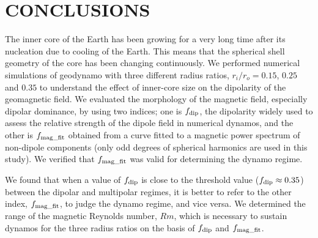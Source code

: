 \section{CONCLUSIONS}

{\color{red}
The inner core of the Earth has been growing for a very long time after its nucleation due to cooling of the Earth.
This means that the spherical shell geometry of the core has been changing continuously.
We performed numerical simulations of geodynamo with three different radius ratios, $r_i / r_o = 0.15$, $0.25$ and $0.35$ to understand the effect of inner-core size on the dipolarity of the geomagnetic field.
We evaluated the morphology of the magnetic field, especially dipolar dominance, by using two indices; one is $f_{\rm dip}$, the dipolarity widely used to assess the relative strength of the dipole field in numerical dynamos, and the other is $f_{\rm mag\_fit}$ obtained from a curve fitted to a magnetic power spectrum of non-dipole components (only odd degrees of spherical harmonics are used in this study).
We verified that $f_{\rm mag\_fit}$ was valid for determining the dynamo regime.

We found that when a value of $f_{\rm dip}$ is close to the threshold value ($f_{\rm dip} \approx 0.35$) between the dipolar and multipolar regimes, it is better to refer to the other index, $f_{\rm mag\_fit}$, to judge the dynamo regime, and vice versa.
We determined the range of the magnetic Reynolds number, $Rm$, which is necessary to sustain dynamos for the three radius ratios on the basis of $f_{\rm dip}$ and $f_{\rm mag\_fit}$.
}
